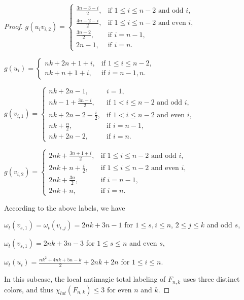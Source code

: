 \documentclass[12pt]{article}
\begin{document}
\begin{proof}
$g(u_{i}v_{i,2})=\begin{cases}
\frac{3n-3-i}{2}, & \text{if $1\leq i\leq n-2$ and odd $i$},\\[4pt]
\frac{4n-2-i}{2}, & \text{if $1\leq i\leq n-2$ and even $i$},\\[4pt]
\frac{3n-2}{2},     &\text{if } i=n-1,\\[4pt]
2n-1, &\text{if }i=n.\end{cases}$\vspace{0.4em}

$g(u_{i})=\begin{cases}
nk+2n+1+i, & \text{if $1\leq i\leq n-2$},\\[4pt]
nk+n+1+i,        & \text{if $i=n-1,n$}.\end{cases}$\vspace{0.4em}

$g(v_{i,1})=\begin{cases}
nk+2n-1, & i=1,\\[4pt]
nk-1+\frac{3n-i}{2}, & \text{if $1<i\leq n-2$ and odd $i$},\\[4pt]
nk+2n-2-\frac{i}{2},        & \text{if $1< i\leq n-2$ and even $i$},\\[4pt]
nk+\frac{n}{2},  &\text{if } i=n-1,\\[4pt]
nk+2n-2, &\text{if }i=n.\end{cases}$\vspace{0.4em}

$g(v_{i,2})=\begin{cases}
2nk+\frac{3n+1+i}{2}, & \text{if $1\leq i\leq n-2$ and odd $i$},\\[4pt]
2nk+n+\frac{i}{2},        & \text{if $1\leq i\leq n-2$ and even $i$},\\[4pt]
2nk+\frac{3n}{2},         & \text{if } i=n-1,\\[4pt]
2nk+n, &\text{if }i=n.\end{cases}$\vspace{0.4em}

\noindent According to the above labels, we have

$\omega_{t}(v_{s,1})=\omega_{t}(v_{i,j})=2nk+3n-1$ for $1\leq s,i\leq n$, $2\leq j\leq k$ and odd $s$,

$\omega_{t}(v_{s,1})=2nk+3n-3$ for $1\leq s\leq n$ and even $s$,

$\omega_{t}(u_{i})=\frac{nk^{2}+4nk+5n-k}{2}+2nk+2n$ for $1\leq i\leq n$.

\noindent In this subcase, the local antimagic total labeling of $F_{n,k}$ uses three distinct colors, and thus $\chi_{lat}(F_{n,k})\leq 3$ for even $n$ and $k$.


\end{proof}
\end{document}
